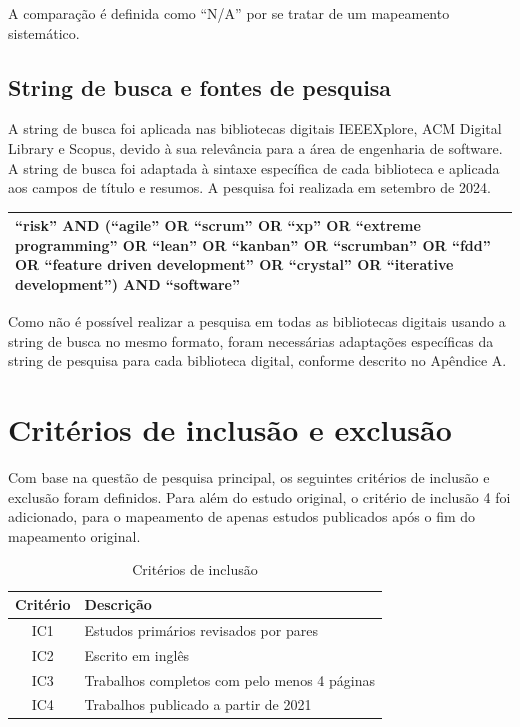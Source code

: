 \documentclass[
	12pt,
	openright,
	twoside,
	a4paper,
	english,
	brazil
	]{abntex2}
\begin{document}
A comparação é definida como “N/A” por se tratar de um mapeamento sistemático.


\subsection{String de busca e fontes de pesquisa}

A string de busca foi aplicada nas bibliotecas digitais IEEEXplore, ACM Digital Library e Scopus, devido à sua relevância para a área de engenharia de software. A string de busca foi adaptada à sintaxe específica de cada biblioteca e aplicada aos campos de título e resumos. A pesquisa foi realizada em setembro de 2024.

\begin{table}[h!]
  \centering
  \begin{tabular}{|p{15cm}|}
  \hline
  “risk” AND (“agile” OR “scrum” OR “xp” OR “extreme programming” OR “lean” OR “kanban” OR “scrumban” OR “fdd” OR “feature driven development” OR “crystal” OR “iterative development”) AND “software” \\ \hline
  \end{tabular}
  \label{tab:consulta-pesquisa}
\end{table}
  
Como não é possível realizar a pesquisa em todas as bibliotecas digitais usando a string de busca no mesmo formato, foram necessárias adaptações específicas da string de pesquisa para cada biblioteca digital, conforme descrito no Apêndice A.


\section{Critérios de inclusão e exclusão}

Com base na questão de pesquisa principal, os seguintes critérios de inclusão e exclusão foram definidos. Para além do estudo original, o critério de inclusão 4 foi adicionado, para o mapeamento de apenas estudos publicados após o fim do mapeamento original.

\begin{table}[h!]
  \centering
  \caption{Critérios de inclusão}
  \begin{tabular}{|c|l|}
  \hline
  \textbf{Critério} & \textbf{Descrição} \\ \hline
  IC1 & Estudos primários revisados por pares \\ \hline
  IC2 & Escrito em inglês \\ \hline
  IC3 & Trabalhos completos com pelo menos 4 páginas \\ \hline
  IC4 & Trabalhos publicado a partir de 2021 \\ \hline
  \end{tabular}
\end{table}
  
\end{document}
